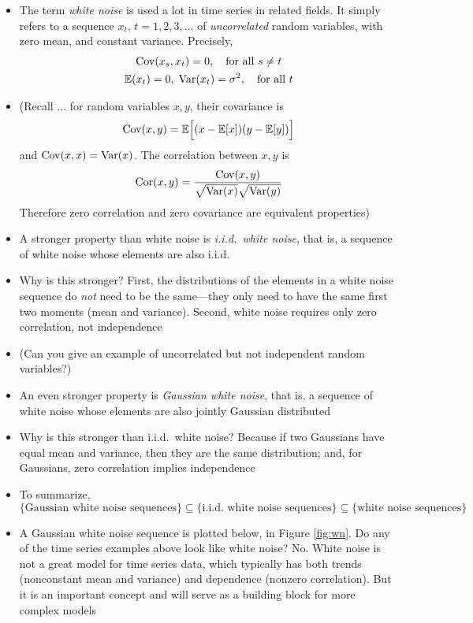 \documentclass{article}
\begin{document}
\begin{itemize}
\item The term \emph{white noise} is used a lot in time series in related
  fields. It simply refers to a sequence $x_t$, $t = 1,2,3,\dots$ of
  \emph{uncorrelated} random variables, with zero mean, and constant
  variance. Precisely, 
  \begin{gather*}
  \operatorname{Cov}(x_s, x_t) = 0, \quad \text{for all $s \not= t$} \\
  \mathbb{E}(x_t) = 0, \; \operatorname{Var}(x_t) = \sigma^2, \quad \text{for all $t$} 
  \end{gather*}

\item (Recall ... for random variables $x,y$, their covariance is 
  \[
  \operatorname{Cov}(x, y) = \mathbb{E}\Big[ (x - \mathbb{E}[x]) (y - \mathbb{E}[y]) \Big]
  \]
  and $\operatorname{Cov}(x, x) = \operatorname{Var}(x)$. The correlation between $x,y$ is
  \[
  \operatorname{Cor}(x, y) = \frac{\operatorname{Cov}(x, y)}{\sqrt{\operatorname{Var}(x)} \sqrt{\operatorname{Var}(y)}}
  \]
  Therefore zero correlation and zero covariance are equivalent properties)

\item A stronger property than white noise is \emph{i.i.d.\ white noise}, that
  is, a sequence of white noise whose elements are also i.i.d.

\item Why is this stronger? First, the distributions of the elements in a white
  noise sequence do \emph{not} need to be the same---they only need to have the
  same first two moments (mean and variance). Second, white noise requires only
  zero correlation, not independence 

\item (Can you give an example of uncorrelated but not independent random
  variables?) 

\item An even stronger property is \emph{Gaussian white noise}, that is, a
  sequence of white noise whose elements are also jointly Gaussian distributed 

\item Why is this stronger than i.i.d.\ white noise? Because if two Gaussians
  have equal mean and variance, then they are the same distribution; and, for
  Gaussians, zero correlation implies independence

\item To summarize, 
  \[
  \{ \text{Gaussian white noise sequences} \} \subseteq
  \{ \text{i.i.d.\ white noise sequences} \} \subseteq
  \{ \text{white noise sequences} \} 
  \]

\item A Gaussian white noise sequence is plotted below, in Figure
  \ref{fig:wn}. Do any of the time series examples above look like white noise?
  No. White noise is not a great model for time series data, which typically has
  both trends (nonconstant mean and variance) and dependence (nonzero
  correlation). But it is an important concept and will serve as a building
  block for more complex models  
\end{itemize}
\end{document}

